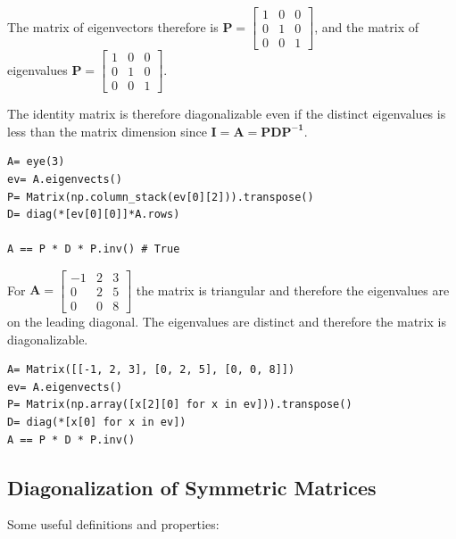 The matrix of eigenvectors therefore is $\mathbf{P} = \left[\begin{matrix}1 & 0 & 0\\0 & 1 & 0\\0 & 0 & 1\end{matrix}\right]$,
and the matrix of eigenvalues $\mathbf{P} = \left[\begin{matrix}1 & 0 & 0\\0 & 1 & 0\\0 & 0 & 1\end{matrix}\right]$.

The identity matrix is therefore diagonalizable even if the distinct eigenvalues is less
than the matrix dimension since $\mathbf{I} = \mathbf{A} = \mathbf{P D P^{-1}}$.

\begin{verbatim}
A= eye(3)
ev= A.eigenvects()
P= Matrix(np.column_stack(ev[0][2])).transpose()
D= diag(*[ev[0][0]]*A.rows)

A == P * D * P.inv() # True
\end{verbatim}

For $\mathbf{A} = \left[\begin{matrix}-1 & 2 & 3\\0 & 2 & 5\\0 & 0 & 8\end{matrix}\right]$
the matrix is triangular and therefore the eigenvalues are on the leading diagonal.
The eigenvalues are distinct and therefore the matrix is diagonalizable.

\begin{verbatim}
A= Matrix([[-1, 2, 3], [0, 2, 5], [0, 0, 8]])
ev= A.eigenvects()
P= Matrix(np.array([x[2][0] for x in ev])).transpose()
D= diag(*[x[0] for x in ev])
A == P * D * P.inv()
\end{verbatim}

\subsection{Diagonalization of Symmetric Matrices}

Some useful definitions and properties:

